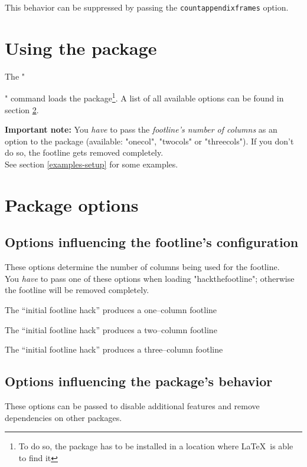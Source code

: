 \documentclass[11pt]{ltxdoc}
\begin{document}
	\medskip
	This behavior can be suppressed by passing the \texttt{countappendixframes} option.
	
	
	
	\clearpage
	




	\section{Using the package}
	The "\usepackage[<Options>]{hackthefootline}" command loads the package\footnote{To do so, the package has to be installed in a location where \LaTeX\ is able to find it}. A list of all available options can be found in section \ref{packageoptions}.
	
	\medskip
	\textbf{Important note:} You \emph{have} to pass the \emph{footline's number of columns} as an option to the package (available: "onecol", "twocols" or "threecols"). If you don't do so, the footline gets removed completely. \\
	See section \ref{examples-setup} for some examples.
	
	
	
	\section{Package options} \label{packageoptions}
	\subsection{Options influencing the footline's configuration}
	These options determine the number of columns being used for the footline. \\
	You \emph{have} to pass one of these options when loading "hackthefootline"; otherwise the footline will be removed completely.
	
	\medskip
	The \enquote{initial footline hack} produces a one--column footline
	
	\medskip
	The \enquote{initial footline hack} produces a two--column footline
	
	\medskip
	The \enquote{initial footline hack} produces a three--column footline
	
	\subsection{Options influencing the package's behavior} \label{behavioropts}
	These options can be passed to disable additional features and remove dependencies on other packages.
	
\end{document}
